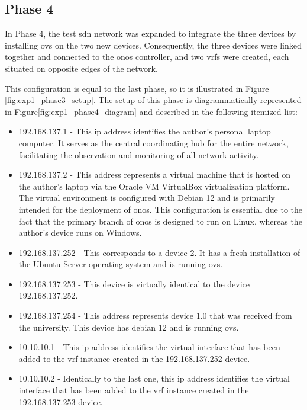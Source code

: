 \subsection{Phase 4}
In Phase 4, the test \gls{sdn} network was expanded to integrate the three devices by installing \gls{ovs} on the two new devices. Consequently, the three devices were linked together and connected to the \gls{onos} controller, and two \glspl{vrf} were created, each situated on opposite edges of the network. 


This configuration is equal to the last phase, so it is illustrated in Figure \ref{fig:exp1_phase3_setup}. The setup of this phase is diagrammatically represented in Figure\ref{fig:exp1_phase4_diagram} and described in the following itemized list:

\begin{itemize}
	\item 192.168.137.1 - This \gls{ip} address identifies the author's personal laptop computer. It serves as the central coordinating hub for the entire network, facilitating the observation and monitoring of all network activity.
	\item 192.168.137.2 - This address represents a virtual machine that is hosted on the author's laptop via the Oracle VM VirtualBox virtualization platform. The virtual environment is configured with Debian 12 and is primarily intended for the deployment of \gls{onos}. This configuration is essential due to the fact that the primary branch of \gls{onos} is designed to run on Linux, whereas the author's device runs on Windows.
	\item 192.168.137.252 - This corresponds to a device 2. It has a fresh installation of the Ubuntu Server operating system and is running \gls{ovs}.
	\item 192.168.137.253 - This device is virtually identical to the device 192.168.137.252.
	\item 192.168.137.254 - This address represents device 1.0 that was received from the university. This device has debian 12 and is running \gls{ovs}.
	\item 10.10.10.1 - This \gls{ip} address identifies the virtual interface that has been added to the \gls{vrf} instance created in the 192.168.137.252 device.
	\item 10.10.10.2 - Identically to the last one, this \gls{ip} address identifies the virtual interface that has been added to the \gls{vrf} instance created in the 192.168.137.253 device.
\end{itemize}

